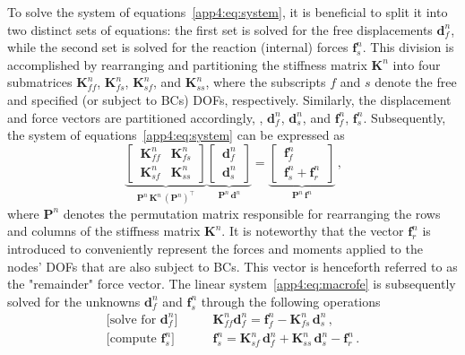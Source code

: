 To solve the system of equations~\eqref{app4:eq:system}, it is beneficial to split it into two distinct sets of equations: the first set is solved for the free displacements $\mathbf{d}^{n}_{f}$, while the second set is solved for the reaction (internal) forces $\mathbf{f}^{n}_{s}$. This division is accomplished by rearranging and partitioning the stiffness matrix $\mathbf{K}^{n}$ into four submatrices $\mathbf{K}^{n}_{ff}$, $\mathbf{K}^{n}_{fs}$, $\mathbf{K}^{n}_{sf}$, and $\mathbf{K}^{n}_{ss}$, where the subscripts $f$ and $s$ denote the free and specified (or subject to \acp{BC}) \acp{DOF}, respectively. Similarly, the displacement and force vectors are partitioned accordingly, \eg{}, $\mathbf{d}^{n}_{f}$, $\mathbf{d}^{n}_{s}$, and $\mathbf{f}^{n}_{f}$, $\mathbf{f}^{n}_{s}$. Subsequently, the system of equations~\eqref{app4:eq:system} can be expressed as
%
\begin{equation}
    \label{app4:eq:macrofe}
    \underbrace{\left[\,\begin{matrix}
      \mathbf{K}^{n}_{ff} & \mathbf{K}^{n}_{fs} \\[0.5em]
      \mathbf{K}^{n}_{sf} & \mathbf{K}^{n}_{ss}
    \end{matrix}\,\right]}_{\displaystyle \mathbf{P}^{n} \, \mathbf{K}^{n} \, (\mathbf{P}^{n})^\top} \underbrace{\left[\,\begin{matrix}
      \mathbf{d}^{n}_{f} \\[0.5em]
      \mathbf{d}^{n}_{s}
    \end{matrix}\,\right]}_{\displaystyle \mathbf{P}^{n} \, \mathbf{d}^{n}} = \underbrace{\left[\,\begin{matrix}
      \mathbf{f}^{n}_{f} \\[0.5em]
      \mathbf{f}^{n}_{s} + \mathbf{f}^{n}_{r}
    \end{matrix}\,\right]}_{\displaystyle \mathbf{P}^{n} \, \mathbf{f}^{n}} \, \text{,}
\end{equation}
%
where $\mathbf{P}^{n}$ denotes the permutation matrix responsible for rearranging the rows and columns of the stiffness matrix $\mathbf{K}^{n}$. It is noteworthy that the vector $\mathbf{f}^{n}_{r}$ is introduced to conveniently represent the forces and moments applied to the nodes' \acp{DOF} that are also subject to \acp{BC}. This vector is henceforth referred to as the "remainder" force vector. The linear system~\eqref{app4:eq:macrofe} is subsequently solved for the unknowns $\mathbf{d}^{n}_{f}$ and $\mathbf{f}^{n}_{s}$ through the following operations
%
\begin{subequations}
  \label{app4:eq:macrosol}
  \begin{align}
    \textrm{[solve for $\mathbf{d}^{n}_{f}$]} \qquad &\mathbf{K}^{n}_{ff}\mathbf{d}^{n}_{f} = \mathbf{f}^{n}_{f} - \mathbf{K}^{n}_{fs}\,\mathbf{d}^{n}_{s} \label{app4:eq:macrodf} \, \text{,} \\
    \textrm{[compute $\mathbf{f}^{n}_{s}$]} \qquad &\mathbf{f}^{n}_{s} = \mathbf{K}^{n}_{sf}\,\mathbf{d}^{n}_{f} + \mathbf{K}^{n}_{ss}\,\mathbf{d}^{n}_{s} - \mathbf{f}^{n}_{r} \, \text{.} \label{app4:eq:macrosolfs}
  \end{align}
\end{subequations}

